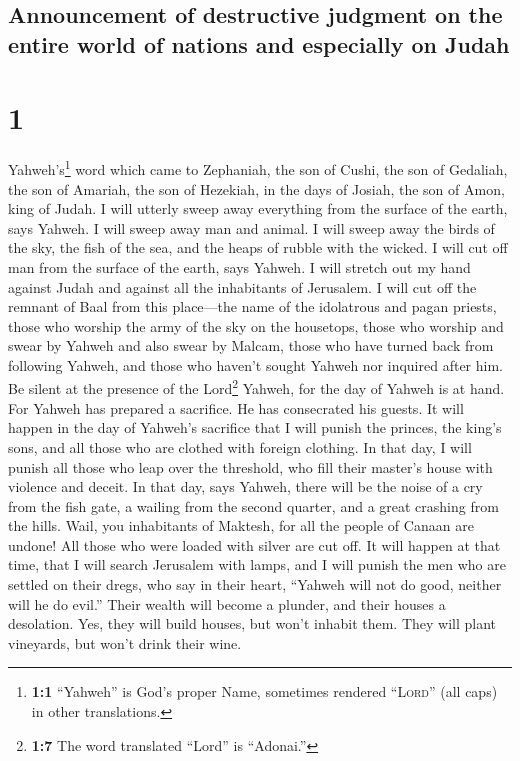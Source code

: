 \hypertarget{announcement-of-destructive-judgment-on-the-entire-world-of-nations-and-especially-on-judah}{%
\subsection{Announcement of destructive judgment on the entire world of
nations and especially on
Judah}\label{announcement-of-destructive-judgment-on-the-entire-world-of-nations-and-especially-on-judah}}

\hypertarget{section}{%
\section{1}\label{section}}

 Yahweh's\footnote{\textbf{1:1} ``Yahweh'' is God's proper
  Name, sometimes rendered ``\textsc{Lord}'' (all caps) in other
  translations.} word which came to Zephaniah, the son of Cushi, the son
of Gedaliah, the son of Amariah, the son of Hezekiah, in the days of
Josiah, the son of Amon, king of Judah.  I will utterly
sweep away everything from the surface of the earth, says Yahweh.
 I will sweep away man and animal. I will sweep away the
birds of the sky, the fish of the sea, and the heaps of rubble with the
wicked. I will cut off man from the surface of the earth, says Yahweh.
 I will stretch out my hand against Judah and against all
the inhabitants of Jerusalem. I will cut off the remnant of Baal from
this place---the name of the idolatrous and pagan priests,
 those who worship the army of the sky on the housetops,
those who worship and swear by Yahweh and also swear by Malcam,
 those who have turned back from following Yahweh, and
those who haven't sought Yahweh nor inquired after him. 
Be silent at the presence of the Lord\footnote{\textbf{1:7} The word
  translated ``Lord'' is ``Adonai.''} Yahweh, for the day of Yahweh is
at hand. For Yahweh has prepared a sacrifice. He has consecrated his
guests.  It will happen in the day of Yahweh's sacrifice
that I will punish the princes, the king's sons, and all those who are
clothed with foreign clothing.  In that day, I will punish
all those who leap over the threshold, who fill their master's house
with violence and deceit.  In that day, says Yahweh,
there will be the noise of a cry from the fish gate, a wailing from the
second quarter, and a great crashing from the hills. 
Wail, you inhabitants of Maktesh, for all the people of Canaan are
undone! All those who were loaded with silver are cut off.
 It will happen at that time, that I will search
Jerusalem with lamps, and I will punish the men who are settled on their
dregs, who say in their heart, ``Yahweh will not do good, neither will
he do evil.''  Their wealth will become a plunder, and
their houses a desolation. Yes, they will build houses, but won't
inhabit them. They will plant vineyards, but won't drink their wine.

